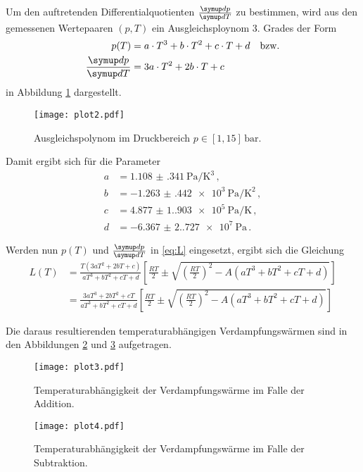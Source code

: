 Um den auftretenden Differentialquotienten $\frac{\dif{p}}{\dif{T}}$ zu bestimmen,
wird aus den gemessenen Wertepaaren $(p,T)$ ein Ausgleichsploynom 3. Grades der Form
\begin{align*}
    p(T) &= a \cdot T^{3} + b \cdot T^{2} + c \cdot T+d \quad \text{bzw.} \\
    \frac{\dif{p}}{\dif{T}} &= 3a \cdot T^{2} + 2b \cdot T + c \quad 
\end{align*}
in Abbildung \ref{fig:plot2} dargestellt.
\begin{figure}[H]
    \centering
    \texttt{[image: plot2.pdf]}
    \caption{Ausgleichspolynom im Druckbereich $p \in [1, 15] \, \mathrm{bar}$.}
    \label{fig:plot2}
\end{figure}

Damit ergibt sich für die Parameter
\begin{align*}
    a &= \qty{1.108(341)}{\pascal\per\cubic\kelvin} \, , \\
    b &= \qty{-1.263(442)e3}{\pascal\per\kelvin\squared} \, , \\ %
    c &= \qty{4.877(1.903)e5}{\pascal\per\kelvin} \, , \\ %
    d &= \qty{-6.367(2.727)e7}{\pascal} \, . %
\end{align*}

Werden nun $p(T)$ und $\frac{\dif{p}}{\dif{T}}$ in \ref{eq:L} eingesetzt, 
ergibt sich die Gleichung 
\begin{align}
    L(T) &= \frac{T \left(3 a T^{2}+2 b T+c\right)}{a T^{3}+b T^{2}+c T+d} \left[\frac{R T}{2} \pm \sqrt{\left(\frac{R T}{2}\right)^{2}-A \left(a T^{3}+b T^{2}+c T+d\right)}\right]  \\
    &= \frac{3 a T^{3}+2 b T^{2}+c T}{a T^{3}+b T^{2}+c T+d} \left[\frac{R T}{2} \pm \sqrt{\left(\frac{R T}{2}\right)^{2}-A\left(a T^{3}+b T^{2}+c T+d\right)}\right] 
\end{align}

Die daraus resultierenden temperaturabhängigen Verdampfungswärmen sind in den Abbildungen
\ref{fig:plot3} und \ref{fig:plot4} aufgetragen.

\begin{figure}[H]
    \centering
    \texttt{[image: plot3.pdf]}
    \caption{Temperaturabhängigkeit der Verdampfungswärme im Falle der Addition.}
    \label{fig:plot3}
\end{figure}

\begin{figure}[H]
    \centering
    \texttt{[image: plot4.pdf]}
    \caption{Temperaturabhängigkeit der Verdampfungswärme im Falle der Subtraktion.}
    \label{fig:plot4}
\end{figure}
